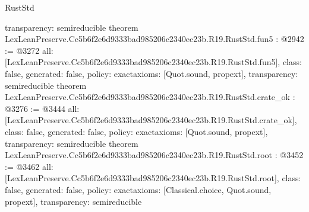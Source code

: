 \begin{lexlean}{RustStd}
\begin{coremodule}
{  transparency: semireducible
}
theorem LexLeanPreserve.Cc5b6f2e6d9333bad985206c2340ec23b.R19.RustStd.fun5 : @2942 := @3272 {
  all: [LexLeanPreserve.Cc5b6f2e6d9333bad985206c2340ec23b.R19.RustStd.fun5],
  class: false,
  generated: false,
  policy: exact{axioms: [Quot.sound, propext]},
  transparency: semireducible
}
theorem LexLeanPreserve.Cc5b6f2e6d9333bad985206c2340ec23b.R19.RustStd.crate_ok : @3276 := @3444 {
  all: [LexLeanPreserve.Cc5b6f2e6d9333bad985206c2340ec23b.R19.RustStd.crate_ok],
  class: false,
  generated: false,
  policy: exact{axioms: [Quot.sound, propext]},
  transparency: semireducible
}
theorem LexLeanPreserve.Cc5b6f2e6d9333bad985206c2340ec23b.R19.RustStd.root : @3452 := @3462 {
  all: [LexLeanPreserve.Cc5b6f2e6d9333bad985206c2340ec23b.R19.RustStd.root],
  class: false,
  generated: false,
  policy: exact{axioms: [Classical.choice, Quot.sound, propext]},
  transparency: semireducible
}


\end{coremodule}
\end{lexlean}
